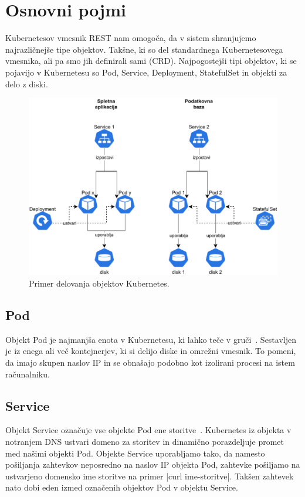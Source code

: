 \documentclass[a4paper, 12pt]{book}
\begin{document}
\section{Osnovni pojmi}
Kubernetesov vmesnik REST nam omogoča, da v sistem shranjujemo najrazličnejše tipe objektov.
Takšne, ki so del standardnega Kubernetesovega vmesnika, ali pa smo jih definirali sami (CRD).
Najpogostejši tipi objektov, ki se pojavijo v Kubernetesu so Pod, Service, Deployment, StatefulSet in objekti za delo z diski.
\begin{figure}[h]
\begin{center}
\includegraphics[width=1.0\textwidth]{images/Kubernetes-simple-schema.pdf}
\end{center}
\caption{Primer delovanja objektov Kubernetes.}
\label{problem-povezanih-clustrov}
\end{figure}
\subsection{Pod}
Objekt Pod je najmanjša enota v Kubernetesu, ki lahko teče v gruči~\cite{pod}.
Sestavljen je iz enega ali več kontejnerjev, ki si delijo diske in omrežni vmesnik.
To pomeni, da imajo skupen naslov IP in se obnašajo podobno kot izolirani procesi na istem računalniku.
\subsection{Service}
Objekt Service označuje vse objekte Pod ene storitve~\cite{service}.
Kubernetes iz objekta v notranjem DNS ustvari domeno za storitev in dinamično porazdeljuje promet med našimi objekti Pod.
Objekte Service uporabljamo tako, da namesto pošiljanja zahtevkov neposredno na naslov IP objekta Pod, zahtevke pošiljamo na ustvarjeno domensko ime storitve na primer \spverb|curl ime-storitve|.
Takšen zahtevek nato dobi eden izmed označenih objektov Pod v objektu Service.
\end{document}

